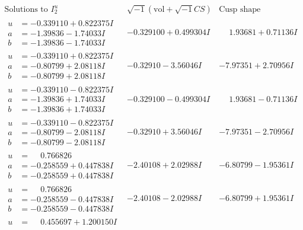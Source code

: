 \documentclass[1p]{elsarticle_modified}
\theoremstyle{definition}
\newcommand{\I}{\sqrt{-1}}
\begin{document}
$$\begin{array}{c|c|c}  
\text{Solutions to }I^u_{2}& \I (\text{vol} + \sqrt{-1}CS) & \text{Cusp shape}\\
 \hline 
\begin{aligned}
u &= -0.339110 + 0.822375 I \\
a &= -1.39836 - 1.74033 I \\
b &= -1.39836 - 1.74033 I\end{aligned}
 & -0.329100 + 0.499304 I & \phantom{-}1.93681 + 0.71136 I \\ \hline\begin{aligned}
u &= -0.339110 + 0.822375 I \\
a &= -0.80799 + 2.08118 I \\
b &= -0.80799 + 2.08118 I\end{aligned}
 & -0.32910 - 3.56046 I & -7.97351 + 2.70956 I \\ \hline\begin{aligned}
u &= -0.339110 - 0.822375 I \\
a &= -1.39836 + 1.74033 I \\
b &= -1.39836 + 1.74033 I\end{aligned}
 & -0.329100 - 0.499304 I & \phantom{-}1.93681 - 0.71136 I \\ \hline\begin{aligned}
u &= -0.339110 - 0.822375 I \\
a &= -0.80799 - 2.08118 I \\
b &= -0.80799 - 2.08118 I\end{aligned}
 & -0.32910 + 3.56046 I & -7.97351 - 2.70956 I \\ \hline\begin{aligned}
u &= \phantom{-}0.766826\phantom{ +0.000000I} \\
a &= -0.258559 + 0.447838 I \\
b &= -0.258559 + 0.447838 I\end{aligned}
 & -2.40108 + 2.02988 I & -6.80799 - 1.95361 I \\ \hline\begin{aligned}
u &= \phantom{-}0.766826\phantom{ +0.000000I} \\
a &= -0.258559 - 0.447838 I \\
b &= -0.258559 - 0.447838 I\end{aligned}
 & -2.40108 - 2.02988 I & -6.80799 + 1.95361 I \\ \hline\begin{aligned}
u &= \phantom{-}0.455697 + 1.200150 I \\

\end{aligned}
\end{array}$$
\end{document}
